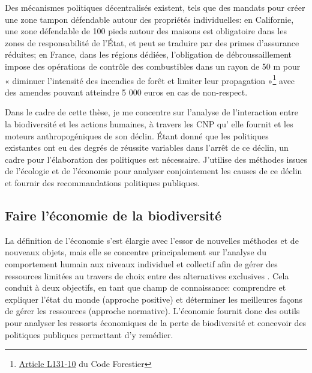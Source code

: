 Des mécanismes politiques décentralisés existent, tels que des mandats pour créer une zone tampon défendable autour des propriétés individuelles: en Californie, une zone défendable de 100 pieds autour des maisons est obligatoire dans les zones de responsabilité de l'État, et peut se traduire par des primes d'assurance réduites; en France, dans les régions dédiées, l'obligation de débroussaillement impose des opérations de contrôle des combustibles dans un rayon de 50 m pour « diminuer l'intensité des incendies de forêt et limiter leur propagation »\footnote{\href{https://www.legifrance.gouv.fr/codes/article_lc/LEGIARTI000047809197}{Article L131-10} du Code Forestier} avec des amendes pouvant atteindre 5 000 euros en cas de non-respect.

Dans le cadre de cette thèse, je me concentre sur l'analyse de l'interaction entre la biodiversité et les actions humaines, à travers les CNP qu' elle fournit et les moteurs anthropogéniques de son déclin. Étant donné que les politiques existantes ont eu des degrés de réussite variables dans l'arrêt de ce déclin, un cadre pour l'élaboration des politiques est nécessaire. J'utilise des méthodes issues de l'écologie et de l'économie pour analyser conjointement les causes de ce déclin et fournir des recommandations politiques publiques.  


{}
\subsection*{Faire l'économie de la biodiversité}

La définition de l'économie s'est élargie avec l'essor de nouvelles méthodes et de nouveaux objets, mais elle se concentre principalement sur l'analyse du comportement humain aux niveaux individuel et collectif afin de gérer des ressources limitées au travers de choix entre des alternatives exclusives \citep{mankiw_principles_2011, bade_foundations_2002, backhouse_retrospectives_2009}. Cela conduit à deux objectifs, en tant que champ de connaissance: comprendre et expliquer l'état du monde (approche positive) et déterminer les meilleures façons de gérer les ressources (approche normative). L'économie fournit donc des outils pour analyser les ressorts économiques de la perte de biodiversité et concevoir des politiques publiques permettant d'y remédier.

